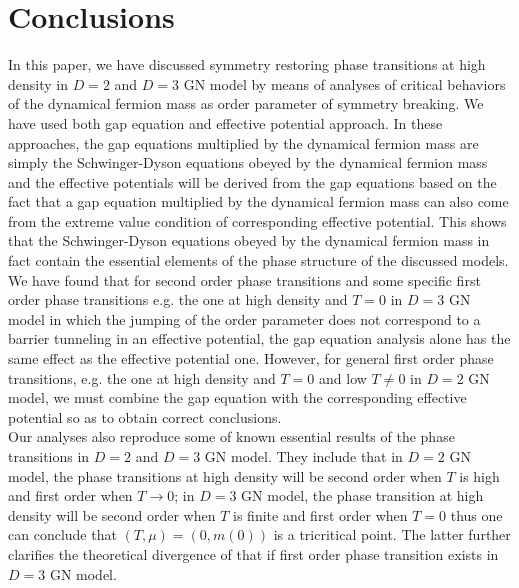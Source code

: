 \documentclass[a4paper,eqsecnum]{revtex4}
\begin{document}
\section{Conclusions \label{sec: conclusions}}
In this paper, we have discussed symmetry restoring phase transitions at high density 
in $D=2$ and $D=3$ GN model by means of analyses of critical behaviors of the dynamical 
fermion mass as order parameter of symmetry breaking. We have used both gap 
equation and effective potential approach. In these approaches, the gap equations 
multiplied by the dynamical fermion mass are simply the Schwinger-Dyson equations 
obeyed by the dynamical fermion mass and the effective potentials will be derived 
from the gap equations based on the fact that a gap equation multiplied by the 
dynamical fermion mass can also come from the extreme value condition of corresponding 
effective potential. This shows that the Schwinger-Dyson equations obeyed by the 
 dynamical fermion mass in fact contain the essential elements of the phase structure 
of the discussed models. We have found that for second order phase transitions and 
some specific first order phase transitions e.g. the one at high density and $T=0$ 
in $D=3$ GN model in which the jumping of the order parameter does not correspond 
to a barrier tunneling in an effective potential, the gap equation analysis alone 
has the same effect as the effective potential one. However, for general first order 
phase transitions, e.g. the one  at high density and $T=0$ and low $T\neq 0$ in $D=2$ 
GN model, we must combine the gap equation with the corresponding effective potential 
so as to obtain correct conclusions. \\
\indent Our analyses also reproduce some of known essential results of the phase 
transitions in $D=2$ and $D=3$ GN model. They include that in $D=2$ GN model, the 
phase transitions at high density will be second order when $T$ is high and first 
order when $T\to 0$; in $D=3$ GN model, the phase transition at high density will be second order when $T$ is finite and first order when $T=0$ thus one can conclude that $(T,\mu)=(0,m(0))$ is a tricritical point. The latter further clarifies the theoretical divergence of that if first order phase transition exists in $D=3$ GN model. 
\end{document}
